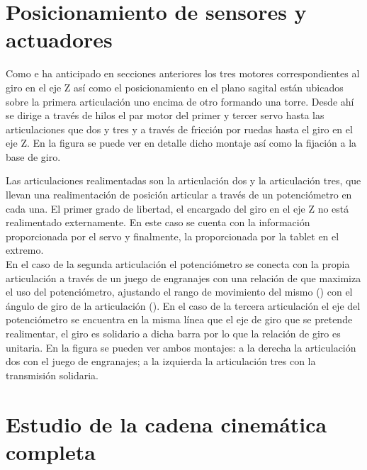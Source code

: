 \section{Posicionamiento de sensores y actuadores} \label{sec:Mecanica:sensores_actuadore}

	Como e ha anticipado en secciones anteriores los tres motores correspondientes al giro en el eje Z así como el posicionamiento en el plano sagital están ubicados sobre la primera articulación uno encima de otro formando una torre. Desde ahí se dirige a través de hilos el par motor del primer y tercer servo hasta las articulaciones que dos y tres y a través de fricción por ruedas hasta el giro en el eje Z. En la figura \completar se puede ver en detalle dicho montaje así como la fijación a la base de giro.
	\\


	Las articulaciones realimentadas son la articulación dos y la articulación tres, que llevan una realimentación de posición articular a través de un potenciómetro en cada una. El primer grado de libertad, el encargado del giro en el eje Z no está realimentado externamente. En este caso se cuenta con la información proporcionada por el servo y finalmente, la proporcionada por la tablet en el extremo.
	\\

	En el caso de la segunda articulación el potenciómetro se conecta con la propia articulación a través de un juego de engranajes con una relación de \completar que maximiza el uso del potenciómetro, ajustando el rango de movimiento del mismo () con el ángulo de giro de la articulación (). En el caso de la tercera articulación el eje del potenciómetro se encuentra en la misma línea que el eje de giro que se pretende realimentar, el giro es solidario a dicha barra por lo que la relación de giro es unitaria. En la figura \completar se pueden ver ambos montajes: a la derecha la articulación dos con el juego de engranajes; a la izquierda la articulación tres con la transmisión solidaria.


\section{Estudio de la cadena cinemática completa} \label{sec:Mecanica:cadena_cinematica}

